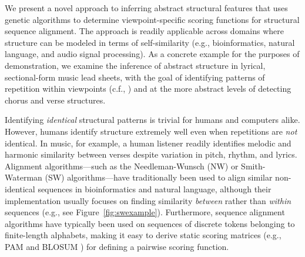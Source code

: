 \documentclass[phd,electronic,oneside,twosidetoc,letterpaper,chaptercenter,parttop,lof,lot]{byumsphd}
\begin{document}
We present a novel approach to inferring abstract structural features that uses genetic algorithms to determine viewpoint-specific scoring functions for structural sequence alignment. The approach is readily applicable across domains where structure can be modeled in terms of self-similarity (e.g., bioinformatics, natural language, and audio signal processing). As a concrete example for the purposes of demonstration, we examine the inference of abstract structure in lyrical, sectional-form music lead sheets, with the goal of identifying patterns of repetition within viewpoints (c.f., \cite{conklin1995multiple}) and at the more abstract levels of detecting chorus and verse structures.

Identifying \textit{identical} structural patterns is trivial for humans and computers alike. However, humans identify structure extremely well even when repetitions are \textit{not} identical. In music, for example, a human listener readily identifies melodic and harmonic similarity between verses despite variation in pitch, rhythm, and lyrics. Alignment algorithms---such as the Needleman-Wunsch (NW) \cite{needleman1970general} or Smith-Waterman (SW) \cite{smith1981identification} algorithms---have traditionally been used to align similar non-identical sequences in bioinformatics and natural language, although their implementation usually focuses on finding similarity \textit{between} rather than \textit{within} sequences (e.g., see Figure~\ref{fig:swexample}). Furthermore, sequence alignment algorithms have typically been used on sequences of discrete tokens belonging to finite-length alphabets, making it easy to derive static scoring matrices (e.g., PAM \cite{dayhoff197822} and BLOSUM \cite{henikoff1992amino}) for defining a pairwise scoring function.
\end{document}
